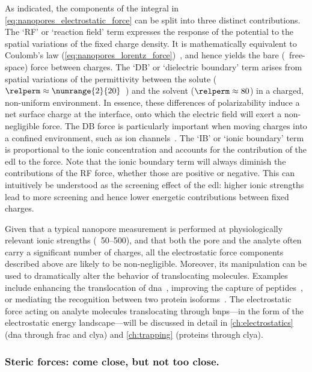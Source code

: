 %
As indicated, the components of the integral in \cref{eq:nanopores_electrostatic_force} can be split into
three distinct contributions. The `RF' or `reaction field' term expresses the response of the potential to the
spatial variations of the fixed charge density. It is mathematically equivalent to Coulomb's law
(\cref{eq:nanopores_lorentz_force})~\cite{Im-1998}, and hence yields the bare (\ie~free-space) force between
charges. The `DB' or `dielectric boundary' term arises from spatial variations of the permittivity between the
solute ($\relperm \approx \text{\numrange{2}{20}}$~\cite{Li-2013}) and the solvent ($\relperm \approx 80$) in
a charged, non-uniform environment. In essence, these differences of polarizability induce a net surface
charge at the interface, onto which the electric field will exert a non-negligible force. The DB force is
particularly important when moving charges into a confined environment, such as ion
channels~\cite{Nadler-2003}. The `IB' or `ionic boundary' term is proportional to the ionic concentration and
accounts for the contribution of the \gls{edl} to the force. Note that the ionic boundary term will always
diminish the contributions of the RF force, whether those are positive or negative. This can intuitively be
understood as the screening effect of the \gls{edl}: higher ionic strengths lead to more screening and hence
lower energetic contributions between fixed charges.

Given that a typical nanopore measurement is performed at physiologically relevant ionic strengths
(\eg~\SIrange{50}{500}{\mM}), and that both the pore and the analyte often carry a significant number of
charges, all the electrostatic force components described above are likely to be non-negligible. Moreover, its
manipulation can be used to dramatically alter the behavior of translocating molecules. Examples include
enhancing the translocation of \gls{dna}~\cite{Maglia-2008}, improving the capture of
peptides~\cite{Asandei-2015b,Asandei-2016}, or mediating the recognition between two protein
isoforms~\cite{Fahie-2015b}. The electrostatic force acting on analyte molecules translocating through
\glspl{bnp}---in the form of the electrostatic energy landscape---will be discussed in detail in
\cref{ch:electrostatics} (\gls{dna} through \gls{frac} and \gls{clya}) and \cref{ch:trapping} (proteins
through \gls{clya}).


\subsubsection{Steric forces: come close, but not too close.}
%

